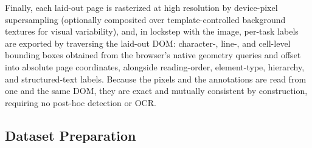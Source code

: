Finally, each laid-out page is rasterized at high resolution by device-pixel supersampling (optionally composited over template-controlled background textures for visual variability), and, in lockstep with the image, per-task labels are exported by traversing the laid-out DOM: character-, line-, and cell-level bounding boxes obtained from the browser's native geometry queries and offset into absolute page coordinates, alongside reading-order, element-type, hierarchy, and structured-text labels. Because the pixels and the annotations are read from one and the same DOM, they are exact and mutually consistent by construction, requiring no post-hoc detection or OCR.

\subsection{Dataset Preparation}
\label{sec:dataset}

